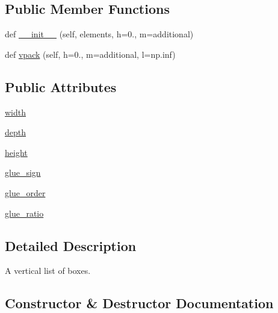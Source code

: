 \subsection*{Public Member Functions}
\begin{DoxyCompactItemize}
\item 
def \hyperlink{classmatplotlib_1_1__mathtext_1_1Vlist_a83cfec9c09594d972569bcef83237b6c}{\+\_\+\+\_\+init\+\_\+\+\_\+} (self, elements, h=0., m=\textquotesingle{}additional\textquotesingle{})
\item 
def \hyperlink{classmatplotlib_1_1__mathtext_1_1Vlist_af4e54214ba112cfa274e7f5786cf2ae2}{vpack} (self, h=0., m=\textquotesingle{}additional\textquotesingle{}, l=np.\+inf)
\end{DoxyCompactItemize}
\subsection*{Public Attributes}
\begin{DoxyCompactItemize}
\item 
\hyperlink{classmatplotlib_1_1__mathtext_1_1Vlist_a182482272d2400f399b21ec968130f66}{width}
\item 
\hyperlink{classmatplotlib_1_1__mathtext_1_1Vlist_a0973397979d7bf138747a41ff7b64af0}{depth}
\item 
\hyperlink{classmatplotlib_1_1__mathtext_1_1Vlist_aa4e3d4b31f6ff113d010c38fed6e0e10}{height}
\item 
\hyperlink{classmatplotlib_1_1__mathtext_1_1Vlist_adfa2be861ecb0403ebff24af06c30697}{glue\+\_\+sign}
\item 
\hyperlink{classmatplotlib_1_1__mathtext_1_1Vlist_a8ee523bcfb9f02b30cc0cfb4ae0af244}{glue\+\_\+order}
\item 
\hyperlink{classmatplotlib_1_1__mathtext_1_1Vlist_a958ffab52794e4058a6d152b8c710006}{glue\+\_\+ratio}
\end{DoxyCompactItemize}


\subsection{Detailed Description}
\begin{DoxyVerb}A vertical list of boxes.\end{DoxyVerb}
 

\subsection{Constructor \& Destructor Documentation}
\mbox{\label{classmatplotlib_1_1__mathtext_1_1Vlist_a83cfec9c09594d972569bcef83237b6c}} 
